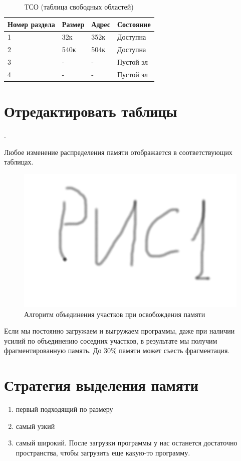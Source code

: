 \begin{table}[H]
\caption{ТСО (таблица свободных областей)}
\begin{tabular}{|l|l|l|l|}
Номер раздела & Размер & Адрес & Состояние \\
\hline
1 & 32к & 352к & Доступна \\ 
\hline
2 & 540к & 504к & Доступна \\
\hline
3 & - & - & Пустой эл \\
\hline
4 & - & - & Пустой эл\\
\hline
\end{tabular}
\end{table}

\section{Отредактировать таблицы}. 

Любое изменение распределения памяти отображается в соответствующих таблицах. 

\begin{figure}[H]
    \centering
    \includegraphics[width=\textwidth]{pic/1.png}
    \caption{Алгоритм объединения участков при освобождения памяти}
\end{figure}

Если мы постоянно загружаем и выгружаем программы, даже при наличии усилий по объединению соседних участков, в результате мы получим фрагментированную память. До 30\% памяти может съесть фрагментация.

\section{Стратегия выделения памяти}
\begin{enumerate}
    \item первый подходящий по размеру
    \item самый узкий 
    \item самый широкий. После загрузки программы у нас останется достаточно пространства, чтобы загрузить еще какую-то программу.
\end{enumerate} 

